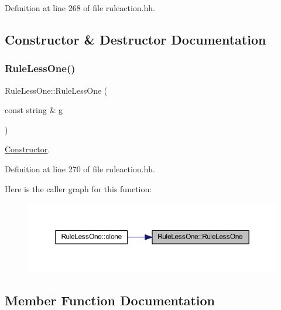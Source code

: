 Definition at line 268 of file ruleaction.\+hh.



\subsection{Constructor \& Destructor Documentation}
\mbox{\label{class_rule_less_one_a5205237e5159d2accce095129aef61df}} 
\subsubsection{\texorpdfstring{RuleLessOne()}{RuleLessOne()}}
{\footnotesize\ttfamily Rule\+Less\+One\+::\+Rule\+Less\+One (\begin{DoxyParamCaption}\item[{const string \&}]{g }\end{DoxyParamCaption})\hspace{0.3cm}{\ttfamily [inline]}}



\mbox{\hyperlink{class_constructor}{Constructor}}. 



Definition at line 270 of file ruleaction.\+hh.

Here is the caller graph for this function\+:
\nopagebreak
\begin{figure}[H]
\begin{center}
\leavevmode
\includegraphics[width=350pt]{class_rule_less_one_a5205237e5159d2accce095129aef61df_icgraph}
\end{center}
\end{figure}


\subsection{Member Function Documentation}
\mbox{\label{class_rule_less_one_ac787cb9aa39e6d205659bdf236920619}} 

